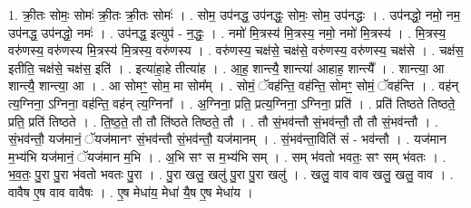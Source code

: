 \documentclass[17pt]{extarticle}
\begin{document}
1. क्री॒तः सोमः॒ सोमः॑ क्री॒तः क्री॒तः सोमः॑ । . सोम॒ उप॑नद्ध॒ उप॑नद्धः॒ सोमः॒ सोम॒ उप॑नद्धः । . उप॑नद्धो॒ नमो॒ नम॒ उप॑नद्ध॒ उप॑नद्धो॒ नमः॑ । . उप॑नद्ध॒ इत्युप॑ - न॒द्धः॒ । . नमो॑ मि॒त्रस्य॑ मि॒त्रस्य॒ नमो॒ नमो॑ मि॒त्रस्य॑ । . मि॒त्रस्य॒ वरु॑णस्य॒ वरु॑णस्य मि॒त्रस्य॑ मि॒त्रस्य॒ वरु॑णस्य । . वरु॑णस्य॒ चक्ष॑से॒ चक्ष॑से॒ वरु॑णस्य॒ वरु॑णस्य॒ चक्ष॑से । . चक्ष॑स॒ इतीति॒ चक्ष॑से॒ चक्ष॑स॒ इति॑ । . इत्या॑हा॒हे तीत्या॑ह । . आ॒ह॒ शान्त्यै॒ शान्त्या॑ आहाह॒ शान्त्यै᳚ । . शान्त्या॒ आ शान्त्यै॒ शान्त्या॒ आ । . आ सोमꣳ॒॒ सोम॒ मा सोम᳚म् । . सोमं॒ ॅवह॑न्ति॒ वह॑न्ति॒ सोमꣳ॒॒ सोमं॒ ॅवह॑न्ति । . वह॑न् त्य॒ग्निना॒ ऽग्निना॒ वह॑न्ति॒ वह॑न् त्य॒ग्निना᳚ । . अ॒ग्निना॒ प्रति॒ प्रत्य॒ग्निना॒ ऽग्निना॒ प्रति॑ । . प्रति॑ तिष्ठते तिष्ठते॒ प्रति॒ प्रति॑ तिष्ठते । . ति॒ष्ठ॒ते॒ तौ तौ ति॑ष्ठते तिष्ठते॒ तौ । . तौ सं॒भव॑न्तौ सं॒भव॑न्तौ॒ तौ तौ सं॒भव॑न्तौ । . सं॒भव॑न्तौ॒ यज॑मानं॒ ॅयज॑मानꣳ सं॒भव॑न्तौ सं॒भव॑न्तौ॒ यज॑मानम् । . सं॒भव॑न्ता॒विति॑ सं - भव॑न्तौ । . यज॑मान म॒भ्य॑भि यज॑मानं॒ ॅयज॑मान म॒भि । . अ॒भि सꣳ स म॒भ्य॑भि सम् । . सम् भ॑वतो भवतः॒ सꣳ सम् भ॑वतः । . भ॒व॒तः॒ पु॒रा पु॒रा भ॑वतो भवतः पु॒रा । . पु॒रा खलु॒ खलु॑ पु॒रा पु॒रा खलु॑ । . खलु॒ वाव वाव खलु॒ खलु॒ वाव । . वावैष ए॒ष वाव वावैषः । . ए॒ष मेधा॑य॒ मेधा॑ यै॒ष ए॒ष मेधा॑य । \newline
\end{document}
